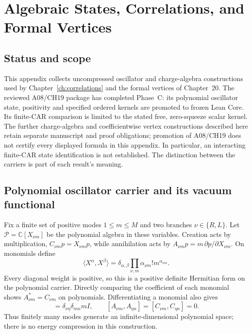 \chapter[Algebraic States and Formal Correlations]{Algebraic States, Correlations, and Formal Vertices}
\label{app:states_correlations}

\section{Status and scope}

This appendix collects uncompressed oscillator and charge-algebra constructions
used by Chapter~\ref{ch:correlations} and the formal vertices of Chapter~20.
The reviewed A08/CH19 package has completed Phase~C: its polynomial oscillator
state, positivity and specified ordered kernels are promoted to frozen Lean
Core. Its finite-CAR comparison is limited to the stated free, zero-squeeze
scalar kernel. The further charge-algebra and coefficientwise vertex
constructions described here retain separate manuscript and proof obligations;
promotion of A08/CH19 does not certify every displayed formula in this appendix.
In particular, an interacting finite-CAR state identification is not established.
The distinction between the carriers is part of each result's meaning.

\section{Polynomial oscillator carrier and its vacuum functional}

Fix a finite set of positive modes $1\leq m\leq M$ and two branches
$\nu\in\{R,L\}$. Let $\mathcal P=\mathbb C[X_{\nu m}]$ be the polynomial
algebra in these variables. Creation acts by multiplication,
$C_{\nu m}p=X_{\nu m}p$, while annihilation acts by
$A_{\nu m}p=m\,\partial p/\partial X_{\nu m}$. On monomials define
\begin{equation}
 \langle X^\alpha,X^\beta\rangle
 =\delta_{\alpha,\beta}\prod_{\nu,m}\alpha_{\nu m}!
                                      m^{\alpha_{\nu m}}.
 \label{eq:a08-polynomial-gram}
\end{equation}
Every diagonal weight is positive, so this is a positive definite Hermitian
form on the polynomial carrier. Directly comparing the coefficient of each
monomial shows $A_{\nu m}^*=C_{\nu m}$ on polynomials. Differentiating a
monomial also gives
\begin{equation}
 [A_{\nu m},C_{\eta n}]
   =\delta_{\nu\eta}\delta_{mn}mI,
 \qquad [A_{\nu m},A_{\eta n}]=[C_{\nu m},C_{\eta n}]=0.
 \label{eq:a08-polynomial-ccr}
\end{equation}
Thus finitely many modes generate an infinite-dimensional polynomial space;
there is no energy compression in this construction.

